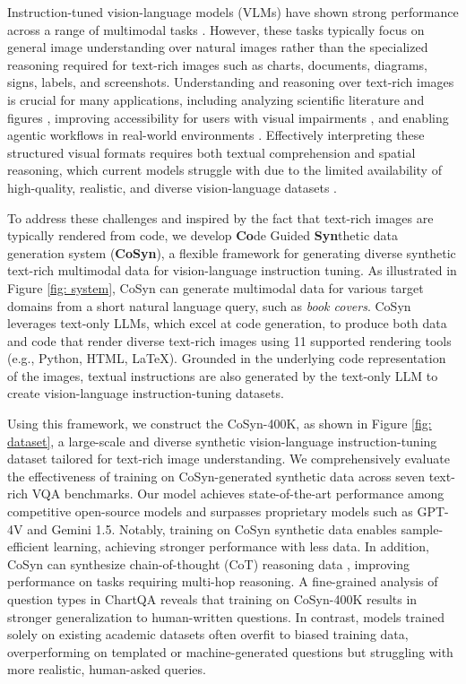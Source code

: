 Instruction-tuned vision-language models (VLMs) have shown strong performance across a range of multimodal tasks \citep{clip,gpt4,liu2023llava}.
However, these tasks typically focus on general image understanding over natural images rather than the specialized reasoning required for text-rich images such as charts, documents, diagrams, signs, labels, and screenshots.
Understanding and reasoning over text-rich images is crucial for many applications, including analyzing scientific literature and figures \cite{asai2024openscholar}, improving accessibility for users with visual impairments \cite{gurari2018vizwiz}, and enabling agentic workflows in real-world environments \cite{OSWorld}.
Effectively interpreting these structured visual formats requires both textual comprehension and spatial reasoning, which current models struggle with due to the limited availability of high-quality, realistic, and diverse vision-language datasets \citep{methani2020plotqa}.

To address these challenges and inspired by the fact that text-rich images are typically rendered from code, we develop \textbf{Co}de Guided \textbf{Syn}thetic data generation system (\textbf{CoSyn}), a flexible framework for generating diverse synthetic text-rich multimodal data for vision-language instruction tuning.
As illustrated in Figure \ref{fig: system}, CoSyn can generate multimodal data for various target domains from a short natural language query, such as \textit{book covers}.
CoSyn leverages text-only LLMs, which excel at code generation, to produce both data and code that render diverse text-rich images using 11 supported rendering tools (e.g., Python, HTML, LaTeX). 
Grounded in the underlying code representation of the images, textual instructions are also generated by the text-only LLM to create vision-language instruction-tuning datasets.

Using this framework, we construct the CoSyn-400K, as shown in Figure \ref{fig: dataset}, a large-scale and diverse synthetic vision-language instruction-tuning dataset tailored for text-rich image understanding.
We comprehensively evaluate the effectiveness of training on CoSyn-generated synthetic data across seven text-rich VQA benchmarks. 
Our model achieves state-of-the-art performance among competitive open-source models and surpasses proprietary models such as GPT-4V and Gemini 1.5.
Notably, training on CoSyn synthetic data enables sample-efficient learning, achieving stronger performance with less data.
In addition, CoSyn can synthesize chain-of-thought (CoT) reasoning data \citep{wei2022chain}, improving performance on tasks requiring multi-hop reasoning. 
A fine-grained analysis of question types in ChartQA \cite{masry-etal-2022-chartqa} reveals that training on CoSyn-400K results in stronger generalization to human-written questions. 
In contrast, models trained solely on existing academic datasets often overfit to biased training data, overperforming on templated or machine-generated questions but struggling with more realistic, human-asked queries.


